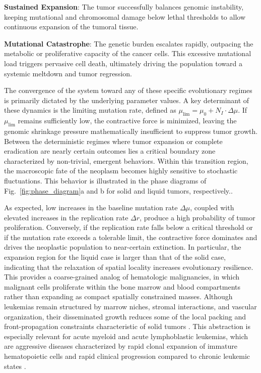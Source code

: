 \documentclass[10pt, aps, rmp,  twocolumn, superscriptaddress, floatfix, showkeys]{revtex4-2}
\begin{document}
{\bf Sustained Expansion}: The tumor successfully balances genomic instability, keeping mutational and chromosomal damage below lethal thresholds to allow continuous expansion of the tumoral tissue.  

{\bf Mutational Catastrophe}: The genetic burden escalates rapidly, outpacing the metabolic or proliferative capacity of the cancer cells. This excessive mutational load triggers pervasive cell death, ultimately driving the population toward a systemic meltdown and tumor regression.  

The convergence of the system toward any of these specific evolutionary regimes is primarily dictated by the underlying parameter values. A key determinant of these dynamics is the limiting mutation rate, defined as $\mu_{\text{lim}} = \mu_0 + N_I \cdot \Delta\mu$. If $\mu_{\text{lim}}$ remains sufficiently low, the contractive force is minimized, leaving the genomic shrinkage pressure mathematically insufficient to suppress tumor growth. Between the deterministic regimes where tumor expansion or complete eradication are nearly certain outcomes lies a critical boundary zone characterized by non-trivial, emergent behaviors. Within this transition region, the macroscopic fate of the neoplasm becomes highly sensitive to stochastic fluctuations.
This behavior is illustrated in the phase diagrams of Fig.~\ref{fig:phase_diagram}a and b for solid and liquid tumors, respectively.. 

As expected, low increases in the baseline mutation rate $\Delta\mu$, coupled with elevated increases in the replication rate $\Delta r$, produce a high probability of tumor proliferation. Conversely, if the replication rate falls below a critical threshold or if the mutation rate exceeds a tolerable limit, the contractive force dominates and drives the neoplastic population to near-certain extinction. In particular, the expansion region for the liquid case is larger than that of the solid case, indicating that the relaxation of spatial locality increases evolutionary resilience. This provides a coarse-grained analog of hematologic malignancies, in which malignant cells proliferate within the bone marrow and blood compartments rather than expanding as compact spatially constrained masses. Although leukemias remain structured by marrow niches, stromal interactions, and vascular organization, their disseminated growth reduces some of the local packing and front-propagation constraints characteristic of solid tumors \cite{clara2020nonsolid,mancini2021tumor}. This abstraction is especially relevant for acute myeloid and acute lymphoblastic leukemias, which are aggressive diseases characterized by rapid clonal expansion of immature hematopoietic cells and rapid clinical progression compared to chronic leukemic states \cite{vakiti2024aml,shimony2023aml,terwilliger2017all}.
\end{document}
